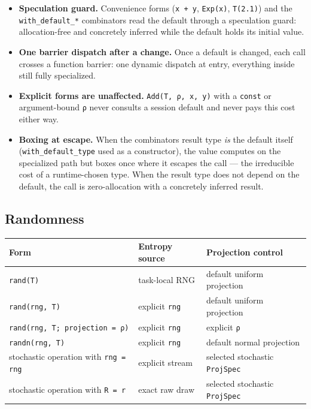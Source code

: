 \begin{itemize}
\item \textbf{Speculation guard.} Convenience forms (\texttt{x + y}, \texttt{Exp(x)}, \texttt{T(2.1)}) and the \texttt{with\_\allowbreak{}default\_\allowbreak{}*} combinators read the default through a speculation guard: allocation-free and concretely inferred while the default holds its initial value.


\item \textbf{One barrier dispatch after a change.} Once a default is changed, each call crosses a function barrier: one dynamic dispatch at entry, everything inside still fully specialized.


\item \textbf{Explicit forms are unaffected.} \texttt{Add(T, ρ, x, y)} with a \texttt{const} or argument-bound \texttt{ρ} never consults a session default and never pays this cost either way.


\item \textbf{Boxing at escape.} When the combinator{\textquotesingle}s result type \emph{is} the default itself (\texttt{with\_\allowbreak{}default\_\allowbreak{}type} used as a constructor), the value computes on the specialized path but boxes once where it escapes the call — the irreducible cost of a runtime-chosen type. When the result type does not depend on the default, the call is zero-allocation with a concretely inferred result.

\end{itemize}


\subsection{Randomness}



\label{12534070565723300530}{}



\begin{table}[h]
\centering
\begin{tabulary}{\linewidth}{L L L}
\toprule
Form & Entropy source & Projection control \\
\toprule
\texttt{rand(T)} & task-local RNG & default uniform projection \\
\texttt{rand(rng, T)} & explicit \texttt{rng} & default uniform projection \\
\texttt{rand(\allowbreak{}rng, T; projection = ρ)} & explicit \texttt{rng} & explicit \texttt{ρ} \\
\texttt{randn(rng, T)} & explicit \texttt{rng} & default normal projection \\
stochastic operation with \texttt{rng = rng} & explicit stream & selected stochastic \texttt{ProjSpec} \\
stochastic operation with \texttt{R = r} & exact raw draw & selected stochastic \texttt{ProjSpec} \\
\bottomrule
\end{tabulary}

\end{table}



